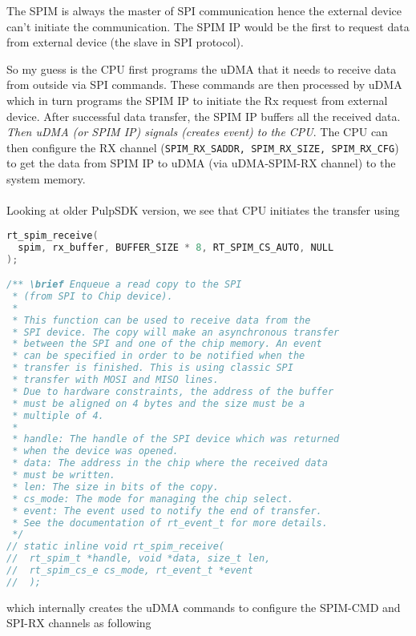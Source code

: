 \documentclass{article}
\begin{document}
The SPIM is always the master of SPI communication hence the external device can't initiate the communication. The
SPIM IP would be the first to request data from external device (the slave in SPI protocol).

So my guess is the
CPU first programs the uDMA that it needs to receive data from outside via SPI commands. These commands are then
processed by uDMA which in turn programs the SPIM IP to initiate the Rx request from external device. After
successful data transfer, the SPIM IP buffers all the received data. \textit{Then uDMA (or SPIM IP)
 signals (creates event) to the CPU}.
The CPU can then configure the RX channel (\texttt{SPIM\_RX\_SADDR, SPIM\_RX\_SIZE, SPIM\_RX\_CFG})
to get the data from SPIM IP to uDMA (via uDMA-SPIM-RX channel) to the system memory.
\\\\
Looking at older PulpSDK version, we see that CPU initiates the transfer using
%
\begin{lstlisting}[language=C]
rt_spim_receive(
  spim, rx_buffer, BUFFER_SIZE * 8, RT_SPIM_CS_AUTO, NULL
);

/** \brief Enqueue a read copy to the SPI
 * (from SPI to Chip device).
 *
 * This function can be used to receive data from the
 * SPI device. The copy will make an asynchronous transfer
 * between the SPI and one of the chip memory. An event
 * can be specified in order to be notified when the
 * transfer is finished. This is using classic SPI
 * transfer with MOSI and MISO lines.
 * Due to hardware constraints, the address of the buffer
 * must be aligned on 4 bytes and the size must be a
 * multiple of 4.
 *
 * handle: The handle of the SPI device which was returned
 * when the device was opened.
 * data: The address in the chip where the received data
 * must be written.
 * len: The size in bits of the copy.
 * cs_mode: The mode for managing the chip select.
 * event: The event used to notify the end of transfer.
 * See the documentation of rt_event_t for more details.
 */
// static inline void rt_spim_receive(
//  rt_spim_t *handle, void *data, size_t len,
//  rt_spim_cs_e cs_mode, rt_event_t *event
//  );
\end{lstlisting}
%
which internally creates the uDMA commands to configure the SPIM-CMD and SPI-RX channels as following
%
\end{document}
